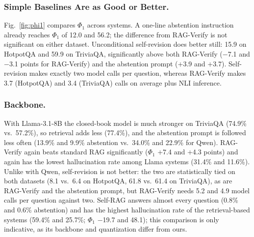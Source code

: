 \documentclass{svproc}
\begin{document}
\subsubsection{Simple Baselines Are as Good or Better.} Fig.~\ref{fig:phi1} compares $\Phi_1$ across systems. A one-line abstention instruction already reaches $\Phi_1$ of 12.0 and 56.2; the difference from RAG-Verify is not significant on either dataset. Unconditional self-revision does better still: 15.9 on HotpotQA and 59.9 on TriviaQA, significantly above both RAG-Verify ($-$7.1 and $-$3.1 points for RAG-Verify) and the abstention prompt ($+$3.9 and $+$3.7). Self-revision makes exactly two model calls per question, whereas RAG-Verify makes 3.7 (HotpotQA) and 3.4 (TriviaQA) calls on average plus NLI inference.

\subsubsection{Backbone.} With Llama-3.1-8B the closed-book model is much stronger on TriviaQA (74.9\% vs.\ 57.2\%), so retrieval adds less (77.4\%), and the abstention prompt is followed less often (13.9\% and 9.9\% abstention vs.\ 34.0\% and 22.9\% for Qwen). RAG-Verify again beats standard RAG significantly ($\Phi_1$ $+$7.4 and $+$4.3 points) and again has the lowest hallucination rate among Llama systems (31.4\% and 11.6\%). Unlike with Qwen, self-revision is not better: the two are statistically tied on both datasets (8.1 vs.\ 6.4 on HotpotQA, 61.8 vs.\ 61.4 on TriviaQA), as are RAG-Verify and the abstention prompt, but RAG-Verify needs 5.2 and 4.9 model calls per question against two. Self-RAG answers almost every question (0.8\% and 0.6\% abstention) and has the highest hallucination rate of the retrieval-based systems (59.4\% and 25.7\%; $\Phi_1$ $-$19.7 and 48.1); this comparison is only indicative, as its backbone and quantization differ from ours.

\end{document}
